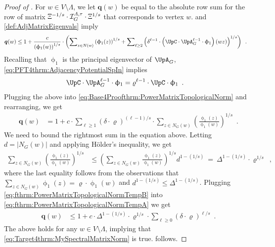 \documentclass[11pt,reqno]{amsart}
\numberwithin{equation}{section}
\newcommand{\cI}{{\mathcal{I}}}
\newcommand{\applegreen}[1]{ {\color{applegreen}#1}}
\newcommand{\blue}[1]{{\color{blue}#1}}
\newcommand{\cadmiumgreen}[1]{{\color{cadmiumgreen}#1}}
\newcommand{\darkmagenta}[1]{{\color{darkmagenta}#1}}
\newcommand{\maxDeg}{{\Delta}}
\newcommand{\pfs}{\darkmagenta{s}}
\newcommand{\infmatrix}{\cI}
\newcommand{\abs}[1]{\blue{|}#1\blue{|}}
\newcommand{\Adjacency}{{\UpA}}
\newcommand{\aspradius}{{\varrho}}
\newcommand{\maxeigenv}{\upphi_1}
\newcommand{\EdgeToV}{\UpC}
\renewcommand{\applegreen}[1]{#1}
\renewcommand{\blue}[1]{#1}
\renewcommand{\cadmiumgreen}[1]{#1}
\renewcommand{\darkmagenta}[1]{#1}
\newcommand{\DBounded}{\mathbold{q}}
\newcommand{\SpGMatrix}{\Upxi}
\newcommand{\kell}{{\color{green(pigment)}\ell}}%
\newcommand{\kw}{\blue{w}}
\newcommand{\kz}{\cadmiumgreen{z}}
\renewcommand{\kell}{\ell}
\renewcommand{\kw}{w}
\renewcommand{\kz}{z}
\begin{document}
\begin{proof}[Proof of ]
For $\kw\in V\setminus \Lambda$, we let $\DBounded(\kw)$ be equal to the absolute row sum for the row of matrix 
$\SpGMatrix^{-1/\pfs} \cdot \infmatrix^{\Lambda, \tau}_G \cdot \SpGMatrix^{1/\pfs}$ that corresponds to vertex $\kw$. 
 and \eqref{def:AdjMatrixEigenvals} imply  
\begin{align} 
\DBounded(\kw)
 & \leq 1+ \frac{c}{\left(\maxeigenv(\kw)\right)^{1/\pfs}} \cdot \left( 
\sum\nolimits_{\kz \in N(\kw)}\left(\maxeigenv(\kz)\right)^{1/\pfs}+ \sum\nolimits_{\kell \geq 2}
\left( \delta^{\kell-1} \cdot \left(\EdgeToV\cdot\Adjacency^{\kell-1}_G\cdot \maxeigenv\right) (\kw\kz) 
\right)^{1/\pfs} 
\right) 
\enspace. \label{eq:Base4Proofthrm:PowerMatrixTopologicalNorm}
\end{align}
%
Recalling that $\maxeigenv$ is the principal eigenvector of $\Adjacency_G$, \eqref{eq:PFT4thrm:AdjacencyPotentialSpIn} implies
\begin{align}
\EdgeToV\cdot\Adjacency^{\kell-1}_G\cdot \maxeigenv &= \aspradius^{\kell-1} \cdot \EdgeToV\cdot \maxeigenv\enspace. 
\end{align}
Plugging the above into \eqref{eq:Base4Proofthrm:PowerMatrixTopologicalNorm} and rearranging, we get 
\begin{align}\label{eq:fthrm:PowerMatrixTopologicalNormTempA}
\DBounded(\kw) & =1+ c \cdot \sum\nolimits_{\kell\geq 1} \left(\delta \cdot \aspradius \right)^{{(\kell-1)}/\pfs} 
\cdot \sum\nolimits_{\kz\in N_G(\kw)}\left( {\textstyle \frac{\maxeigenv(\kz)}{\maxeigenv(\kw)} } \right)^{1/\pfs} \enspace.
\end{align}
We need to bound the rightmost sum in the equation above.
Letting $d=\abs{N_G(\kw)}$ and applying H\"older's inequality,  we get 
\begin{align}\label{eq:fthrm:PowerMatrixTopologicalNormTempB}
\sum\nolimits_{\kz\in N_G(\kw)}\left( {\textstyle\frac{\maxeigenv(\kz)}{ \maxeigenv(\kw)} }\right)^{1/\pfs} & \leq
\left( \sum\nolimits _{\kz\in N_G(\kw)} {\textstyle \frac{\maxeigenv(\kz)}{ \maxeigenv(\kw)}} \right)^{1/\pfs} d^{1-(1/\pfs)}\ = \ 
\maxDeg^{1-(1/\pfs)} \cdot \aspradius^{1/\pfs}\enspace,
\end{align}
where the last equality follows from the observations that $\sum_{\kz\in N_G(\kw)}\maxeigenv(\kz)=\aspradius\cdot \maxeigenv(\kw)$
and $d^{1-(1/\pfs)}\leq \maxDeg^{1-(1/\pfs)}$. 
%
Plugging \eqref{eq:fthrm:PowerMatrixTopologicalNormTempB} into \eqref{eq:fthrm:PowerMatrixTopologicalNormTempA} 
we get 
\begin{align}
\DBounded(\kw) &\leq
 1+ c \cdot \maxDeg^{1-(1/\pfs)} \cdot \aspradius^{1/\pfs} \cdot
 \sum\nolimits_{\kell \geq 0} \left(\delta \cdot \aspradius \right)^{\kell/\pfs} \enspace . \nonumber 
\end{align}
% 
The above holds for any $\kw\in V\setminus \Lambda$,  implying that \eqref{eq:Target4thrm:MySpectralMatrixNorm} is true. 
%
 follows.
\end{proof}
\end{document}
